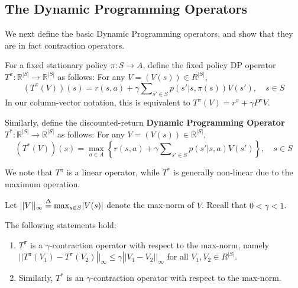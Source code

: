 \subsection{The Dynamic Programming Operators}\label{ss:DP_op}
We next define the basic Dynamic Programming operators, and show that they are in fact contraction operators.

For a fixed stationary policy $\pi :S \to A$, define the fixed policy DP operator $T^\pi:\mathbb R^{|S|} \to \mathbb R^{|S|}$  as follows: For any $V=(V(s))\in R^{|S|}$,
\[(T_{}^\pi (V))(s) = r(s,a) + \gamma \sum\nolimits_{s' \in S} {p(s'|s,\pi (s))V(s')} ,\quad s \in S\]
In our column-vector notation, this is equivalent to  $T_{}^\pi (V) = {r^\pi } + \gamma {P^\pi }V$.

Similarly, define the discounted-return \textbf{Dynamic Programming Operator}  $T^*:\mathbb R^{|S|} \to \mathbb R^{|S|}$ as follows: For any $V=(V(s))\in \mathbb R^{|S|}$,
\[(T_{}^*(V))(s) = \mathop {\max }\limits_{a \in A} \left\{ {r(s,a) + \gamma \sum\nolimits_{s' \in S} {p(s'|s,a)V(s')} } \right\},\quad s \in S\]

We note that $T_{}^\pi $ is a linear operator, while $T_{}^*$ is generally non-linear due to the maximum operation.

Let $||V|{|_\infty } \buildrel \Delta \over = {\max _{s \in S}}|V(s)|$ denote the max-norm of $V$.  Recall that $0 < \gamma  < 1$.

\begin{theorem} The following statements hold:
\begin{enumerate}
  \item $T_{}^\pi $ is a $\gamma$-contraction operator with respect to the max-norm,  namely
                      $||T_{}^\pi ({V_1}) - T_{}^\pi ({V_2})|{|_\infty } \le \gamma ||{V_1} - {V_2}|{|_\infty }$ for all $V_1,V_2\in R^{|S|}$.
  \item Similarly, $T_{}^*$ is an $\gamma$-contraction operator with respect to the max-norm.
\end{enumerate}
\end{theorem}

